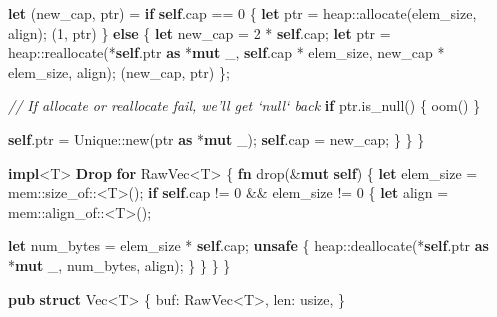 \documentclass[a4paper,]{book}
\newenvironment{Shaded}{\begin{snugshade}}{\end{snugshade}}
\newcommand{\KeywordTok}[1]{\textcolor[rgb]{0.13,0.29,0.53}{\textbf{{#1}}}}
\newcommand{\DecValTok}[1]{\textcolor[rgb]{0.00,0.00,0.81}{{#1}}}
\newcommand{\CommentTok}[1]{\textcolor[rgb]{0.56,0.35,0.01}{\textit{{#1}}}}
\newcommand{\NormalTok}[1]{{#1}}
\begin{document}
\begin{Shaded}
\begin{Highlighting}[]
            \KeywordTok{let} \NormalTok{(new_cap, ptr) = }\KeywordTok{if} \KeywordTok{self}\NormalTok{.cap == }\DecValTok{0} \NormalTok{\{}
                \KeywordTok{let} \NormalTok{ptr = heap::allocate(elem_size, align);}
                \NormalTok{(}\DecValTok{1}\NormalTok{, ptr)}
            \NormalTok{\} }\KeywordTok{else} \NormalTok{\{}
                \KeywordTok{let} \NormalTok{new_cap = }\DecValTok{2} \NormalTok{* }\KeywordTok{self}\NormalTok{.cap;}
                \KeywordTok{let} \NormalTok{ptr = heap::reallocate(*}\KeywordTok{self}\NormalTok{.ptr }\KeywordTok{as} \NormalTok{*}\KeywordTok{mut} \NormalTok{_,}
                                            \KeywordTok{self}\NormalTok{.cap * elem_size,}
                                            \NormalTok{new_cap * elem_size,}
                                            \NormalTok{align);}
                \NormalTok{(new_cap, ptr)}
            \NormalTok{\};}

            \CommentTok{// If allocate or reallocate fail, we'll get `null` back}
            \KeywordTok{if} \NormalTok{ptr.is_null() \{ oom() \}}

            \KeywordTok{self}\NormalTok{.ptr = Unique::new(ptr }\KeywordTok{as} \NormalTok{*}\KeywordTok{mut} \NormalTok{_);}
            \KeywordTok{self}\NormalTok{.cap = new_cap;}
        \NormalTok{\}}
    \NormalTok{\}}
\NormalTok{\}}

\KeywordTok{impl}\NormalTok{<T> }\KeywordTok{Drop} \KeywordTok{for} \NormalTok{RawVec<T> \{}
    \KeywordTok{fn} \NormalTok{drop(&}\KeywordTok{mut} \KeywordTok{self}\NormalTok{) \{}
        \KeywordTok{let} \NormalTok{elem_size = mem::size_of::<T>();}
        \KeywordTok{if} \KeywordTok{self}\NormalTok{.cap != }\DecValTok{0} \NormalTok{&& elem_size != }\DecValTok{0} \NormalTok{\{}
            \KeywordTok{let} \NormalTok{align = mem::align_of::<T>();}

            \KeywordTok{let} \NormalTok{num_bytes = elem_size * }\KeywordTok{self}\NormalTok{.cap;}
            \KeywordTok{unsafe} \NormalTok{\{}
                \NormalTok{heap::deallocate(*}\KeywordTok{self}\NormalTok{.ptr }\KeywordTok{as} \NormalTok{*}\KeywordTok{mut} \NormalTok{_, num_bytes, align);}
            \NormalTok{\}}
        \NormalTok{\}}
    \NormalTok{\}}
\NormalTok{\}}





\KeywordTok{pub} \KeywordTok{struct} \NormalTok{Vec<T> \{}
    \NormalTok{buf: RawVec<T>,}
    \NormalTok{len: usize,}
\NormalTok{\}}


\end{Highlighting}
\end{Shaded}
\end{document}
